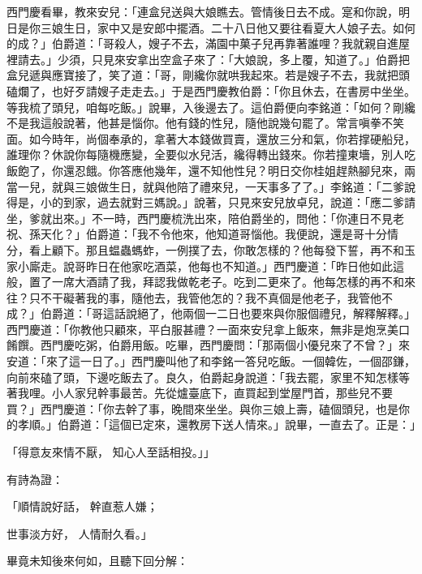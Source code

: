 西門慶看畢，教來安兒：「連盒兒送與大娘瞧去。管情後日去不成。寔和你說，明日是你三娘生日，家中又是安郎中擺酒。二十八日他又要往看夏大人娘子去。如何的成？」伯爵道：「哥殺人，嫂子不去，滿園中菓子兒再靠著誰哩？我就親自進屋裡請去。」少須，只見來安拿出空盒子來了：「大娘說，多上覆，知道了。」伯爵把盒兒遞與應寶接了，笑了道：「哥，剛纔你就哄我起來。若是嫂子不去，我就把頭磕爛了，也好歹請嫂子走走去。」于是西門慶教伯爵：「你且休去，在書房中坐坐。等我梳了頭兒，咱每吃飯。」說畢，入後邊去了。這伯爵便向李銘道：「如何？剛纔不是我這般說著，他甚是惱你。他有錢的性兒，隨他說幾句罷了。常言嗔拳不笑面。如今時年，尚個奉承的，拿著大本錢做買賣，還放三分和氣，你若撑硬船兒，誰理你？休說你每隨機應變，全要似水兒活，纔得轉出錢來。你若撞東墻，別人吃飯飽了，你還忍餓。你答應他幾年，還不知他性兒？明日交你桂姐趕熱腳兒來，兩當一兒，就與三娘做生日，就與他陪了禮來兒，一天事多了了。」李銘道：「二爹說得是，小的到家，過去就對三媽說。」說著，只見來安兒放卓兒，說道：「應二爹請坐，爹就出來。」不一時，西門慶梳洗出來，陪伯爵坐的，問他：「你連日不見老祝、孫天化？」伯爵道：「我不令他來，他知道哥惱他。我便說，還是哥十分情分，看上顧下。那且蝹蟲螞蚱，一例撲了去，你敢怎樣的？他每發下誓，再不和玉家小廝走。說哥昨日在他家吃酒菜，他每也不知道。」西門慶道：「昨日他如此這般，置了一席大酒請了我，拜認我做乾老子。吃到二更來了。他每怎樣的再不和來往？只不干礙著我的事，隨他去，我管他怎的？我不真個是他老子，我管他不成？」伯爵道：「哥這話說絕了，他兩個一二日也要來與你服個禮兒，解釋解釋。」西門慶道：「你教他只顧來，平白服甚禮？一面來安兒拿上飯來，無非是炮烹美口餚饌。西門慶吃粥，伯爵用飯。吃畢，西門慶問：「那兩個小優兒來了不曾？」來安道：「來了這一日了。」西門慶叫他了和李銘一答兒吃飯。一個韓佐，一個邵鎌，向前來磕了頭，下邊吃飯去了。良久，伯爵起身說道：「我去罷，家里不知怎樣等著我哩。小人家兒幹事最苦。先從爐臺底下，直買起到堂屋門首，那些兒不要買？」西門慶道：「你去幹了事，晚間來坐坐。與你三娘上壽，磕個頭兒，也是你的孝順。」伯爵道：「這個已定來，還教房下送人情來。」說畢，一直去了。正是：」

「得意友來情不厭，  知心人至話相投。」」

有詩為證：

「順情說好話，  幹直惹人嫌；

世事淡方好，  人情耐久看。」

畢竟未知後來何如，且聽下回分解：


